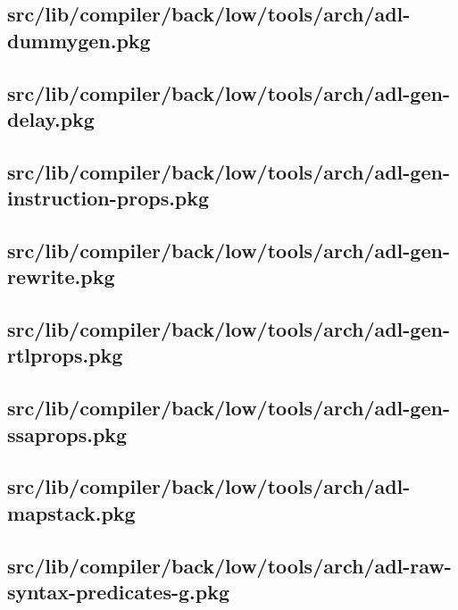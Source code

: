 \subsection{src/lib/compiler/back/low/tools/arch/adl-dummygen.pkg}


\subsection{src/lib/compiler/back/low/tools/arch/adl-gen-delay.pkg}


\subsection{src/lib/compiler/back/low/tools/arch/adl-gen-instruction-props.pkg}


\subsection{src/lib/compiler/back/low/tools/arch/adl-gen-rewrite.pkg}


\subsection{src/lib/compiler/back/low/tools/arch/adl-gen-rtlprops.pkg}


\subsection{src/lib/compiler/back/low/tools/arch/adl-gen-ssaprops.pkg}


\subsection{src/lib/compiler/back/low/tools/arch/adl-mapstack.pkg}


\subsection{src/lib/compiler/back/low/tools/arch/adl-raw-syntax-predicates-g.pkg}


